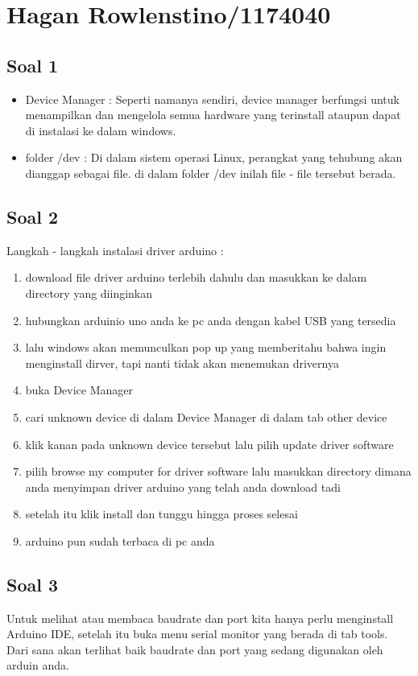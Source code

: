 \section{Hagan Rowlenstino/1174040}
	\subsection{Soal 1} 
		\begin{itemize}
			\item Device Manager : Seperti namanya sendiri, device manager berfungsi untuk menampilkan dan mengelola semua hardware yang terinstall ataupun dapat di instalasi ke dalam windows.

			\item folder /dev : Di dalam sistem operasi Linux, perangkat yang tehubung akan dianggap sebagai file. di dalam folder /dev inilah file - file  tersebut berada.
		\end{itemize}

	\subsection{Soal 2}
	Langkah - langkah instalasi driver arduino :
		\begin{enumerate}
			\item download file driver arduino terlebih dahulu dan masukkan ke dalam directory yang diinginkan
			\item hubungkan arduinio uno anda ke pc anda dengan kabel USB yang tersedia
			\item lalu windows akan memunculkan pop up yang memberitahu bahwa ingin menginstall dirver, tapi nanti tidak akan menemukan drivernya
			\item buka Device Manager 
			\item cari unknown device di dalam Device Manager di dalam tab other device
			\item klik kanan pada unknown device tersebut lalu pilih update driver software
			\item pilih browse my computer for driver software lalu masukkan directory dimana anda menyimpan driver arduino yang telah anda download tadi
			\item setelah itu klik install dan tunggu hingga proses selesai
			\item arduino pun sudah terbaca di pc anda 
		\end{enumerate}

	\subsection{Soal 3}
	Untuk melihat atau membaca baudrate dan port kita hanya perlu menginstall Arduino IDE, setelah itu buka menu serial monitor yang berada di tab tools. Dari sana akan terlihat baik baudrate dan port yang sedang digunakan oleh arduin anda.

